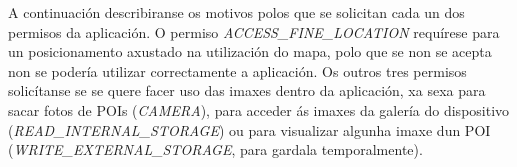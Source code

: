 A continuación describiranse os motivos polos que se solicitan cada un dos permisos da aplicación. O permiso \emph{ACCESS\_FINE\_LOCATION} requírese para un posicionamento axustado na utilización do mapa, polo que se non se acepta non se podería utilizar correctamente a aplicación. Os outros tres permisos solicítanse se se quere facer uso das imaxes dentro da aplicación, xa sexa para sacar fotos de POIs (\emph{CAMERA}), para acceder ás imaxes da galería do dispositivo (\emph{READ\_INTERNAL\_STORAGE}) ou para visualizar algunha imaxe dun POI (\emph{WRITE\_EXTERNAL\_STORAGE}, para gardala temporalmente).
